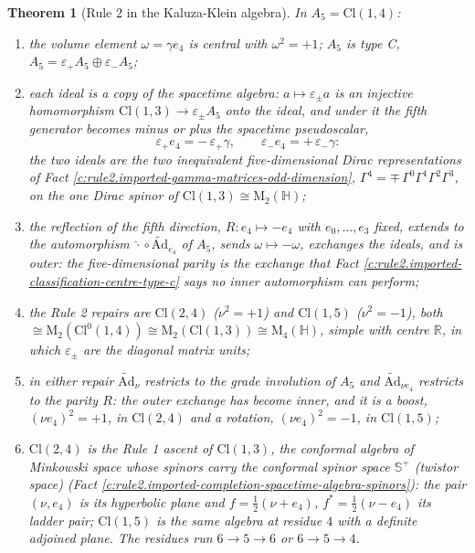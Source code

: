 \documentclass[11pt]{article}
\newtheorem{theorem}{Theorem}[section]
\theoremstyle{definition}
\theoremstyle{plain}
\providecommand{\Ad}{}\renewcommand{\Ad}{\widetilde{\mathrm{Ad}}}
\providecommand{\CS}{}\renewcommand{\CS}{{\mathbb{S}^{+}}}
\providecommand{\Cl}{}\renewcommand{\Cl}{\mathrm{Cl}}
\providecommand{\HH}{}\renewcommand{\HH}{\mathbb{H}}
\providecommand{\Mat}{}\renewcommand{\Mat}{\mathrm{M}}
\providecommand{\R}{}\renewcommand{\R}{\mathbb{R}}
\begin{document}
\begin{theorem}[Rule 2 in the Kaluza-Klein algebra]\label{c:rule2.rule-2-kaluza-klein-algebra}
In $A_5 = \Cl(1,4)$:
\begin{enumerate}
\item[(i)] the volume element $\omega = \gamma e_4$ is central with $\omega^2 = +1$; $A_5$ is type C, $A_5 = \varepsilon_+ A_5 \oplus \varepsilon_- A_5$;
\item[(ii)] each ideal is a copy of the spacetime algebra: $a \mapsto \varepsilon_\pm a$ is an injective homomorphism $\Cl(1,3) \to \varepsilon_\pm A_5$ onto the ideal, and under it the fifth generator becomes minus or plus the spacetime pseudoscalar,
\[
\varepsilon_+ e_4 = -\,\varepsilon_+\gamma, \qquad \varepsilon_- e_4 = +\,\varepsilon_-\gamma :
\]
the two ideals are the two inequivalent five-dimensional Dirac representations of Fact \ref{c:rule2.imported-gamma-matrices-odd-dimension}, $\Gamma^4 = \mp\,\Gamma^0\Gamma^1\Gamma^2\Gamma^3$, on the one Dirac spinor of $\Cl(1,3) \cong \Mat_2(\HH)$;
\item[(iii)] the reflection of the fifth direction, $R: e_4 \mapsto -e_4$ with $e_0, \ldots, e_3$ fixed, extends to the automorphism $\hat{\cdot} \circ \Ad_{e_4}$ of $A_5$, sends $\omega \mapsto -\omega$, exchanges the ideals, and is outer: the five-dimensional parity is the exchange that Fact \ref{c:rule2.imported-classification-centre-type-c} says no inner automorphism can perform;
\item[(iv)] the Rule 2 repairs are $\Cl(2,4)$ ($\nu^2 = +1$) and $\Cl(1,5)$ ($\nu^2 = -1$), both $\cong \Mat_2(\Cl^0(1,4)) \cong \Mat_2(\Cl(1,3)) \cong \Mat_4(\HH)$, simple with centre $\R$, in which $\varepsilon_\pm$ are the diagonal matrix units;
\item[(v)] in either repair $\Ad_\nu$ restricts to the grade involution of $A_5$ and $\Ad_{\nu e_4}$ restricts to the parity $R$: the outer exchange has become inner, and it is a boost, $(\nu e_4)^2 = +1$, in $\Cl(2,4)$ and a rotation, $(\nu e_4)^2 = -1$, in $\Cl(1,5)$;
\item[(vi)] $\Cl(2,4)$ is the Rule 1 ascent of $\Cl(1,3)$, the conformal algebra of Minkowski space whose spinors carry the conformal spinor space $\CS$ (twistor space) (Fact \ref{c:rule2.imported-completion-spacetime-algebra-spinors}): the pair $(\nu, e_4)$ is its hyperbolic plane and $f = \tfrac12(\nu + e_4)$, $f^* = \tfrac12(\nu - e_4)$ its ladder pair; $\Cl(1,5)$ is the same algebra at residue $4$ with a definite adjoined plane. The residues run $6 \to 5 \to 6$ or $6 \to 5 \to 4$.
\end{enumerate}
\end{theorem}
\end{document}
